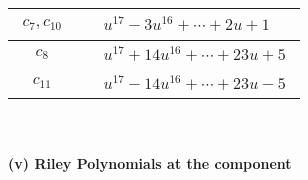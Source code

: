 \documentclass[1p]{elsarticle_modified}
\theoremstyle{definition}
\begin{document}
\begin{tabular}{m{50pt}|m{274pt}}
\hline $$\begin{aligned}c_{7},c_{10}\end{aligned}$$&$\begin{aligned}
&u^{17}-3 u^{16}+\cdots+2 u+1
\end{aligned}$\\
\hline $$\begin{aligned}c_{8}\end{aligned}$$&$\begin{aligned}
&u^{17}+14 u^{16}+\cdots+23 u+5
\end{aligned}$\\
\hline $$\begin{aligned}c_{11}\end{aligned}$$&$\begin{aligned}
&u^{17}-14 u^{16}+\cdots+23 u-5
\end{aligned}$\\
\hline
\end{tabular}\\~\\
\newpage\renewcommand{\arraystretch}{1}
\flushleft \textbf{(v) Riley Polynomials at the component}\newline \\
\end{document}
